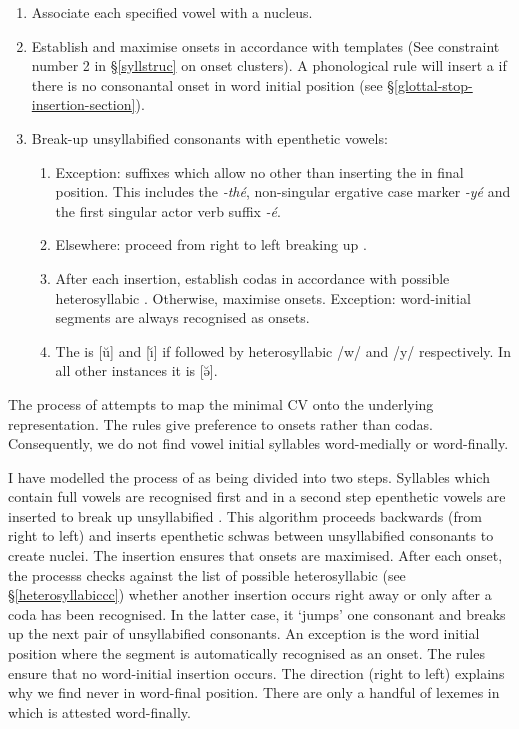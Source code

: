 \begin{enumerate}
	\item Associate each specified vowel with a  nucleus.
	\item Establish and maximise onsets in accordance with  templates (See constraint number 2 in \S{}\ref{syllstruc} on onset clusters). A phonological rule will insert a  if there is no consonantal onset in word initial position (see \S{}\ref{glottal-stop-insertion-section}).
	\item Break-up unsyllabified consonants with epenthetic vowels:
	\begin{enumerate}
		\item Exception: suffixes which allow no other  than inserting the  in final position. This includes the  \emph{-thé}, non-singular ergative case marker \emph{-yé} and the first singular actor verb suffix \emph{-é}.
		\item Elsewhere: proceed from right to left breaking up .
		\item After each  insertion, establish codas in accordance with possible heterosyllabic . Otherwise, maximise onsets. Exception: word-initial segments are always recognised as onsets.
		\item The  is [ŭ] and [ı̆] if followed by heterosyllabic /w/ and /y/ respectively. In all other instances it is [ə̆].
	\end{enumerate}
\end{enumerate}

The process of  attempts to map the minimal  CV onto the underlying representation. The rules give preference to onsets rather than codas. Consequently, we do not find vowel initial syllables word-medially or word-finally.%

I have modelled the process of  as being divided into two steps. Syllables which contain full vowels are recognised first and in a second step epenthetic vowels are inserted to break up unsyllabified . This algorithm proceeds backwards (from right to left) and inserts epenthetic schwas between unsyllabified consonants to create  nuclei. The insertion ensures that onsets are maximised. After each onset, the processs checks against the list of possible heterosyllabic  (see \S{}\ref{heterosyllabiccc}) whether another insertion occurs right away or only after a coda has been recognised. In the latter case, it `jumps' one consonant and breaks up the next pair of unsyllabified consonants. An exception is the word initial position where the segment is automatically recognised as an onset. The rules ensure that no word-initial  insertion occurs. The direction (right to left) explains why we find  never in word-final position. There are only a handful of lexemes in which  is attested word-finally.%

